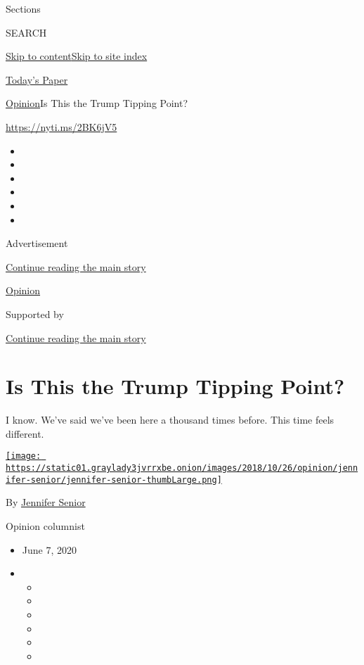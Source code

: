Sections

SEARCH

\protect\hyperlink{site-content}{Skip to
content}\protect\hyperlink{site-index}{Skip to site index}

\href{https://myaccount.nytimes3xbfgragh.onion/auth/login?response_type=cookie\&client_id=vi}{}

\href{https://www.nytimes3xbfgragh.onion/section/todayspaper}{Today's
Paper}

\href{/section/opinion}{Opinion}\textbar{}Is This the Trump Tipping
Point?

\url{https://nyti.ms/2BK6jV5}

\begin{itemize}
\item
\item
\item
\item
\item
\item
\end{itemize}

Advertisement

\protect\hyperlink{after-top}{Continue reading the main story}

\href{/section/opinion}{Opinion}

Supported by

\protect\hyperlink{after-sponsor}{Continue reading the main story}

\hypertarget{is-this-the-trump-tipping-point}{%
\section{Is This the Trump Tipping
Point?}\label{is-this-the-trump-tipping-point}}

I know. We've said we've been here a thousand times before. This time
feels different.

\href{https://www.nytimes3xbfgragh.onion/by/jennifer-senior}{\texttt{[image: https://static01.graylady3jvrrxbe.onion/images/2018/10/26/opinion/jennifer-senior/jennifer-senior-thumbLarge.png]}}

By \href{https://www.nytimes3xbfgragh.onion/by/jennifer-senior}{Jennifer
Senior}

Opinion columnist

\begin{itemize}
\item
  June 7, 2020
\item
  \begin{itemize}
  \item
  \item
  \item
  \item
  \item
  \item
  \end{itemize}
\end{itemize}

